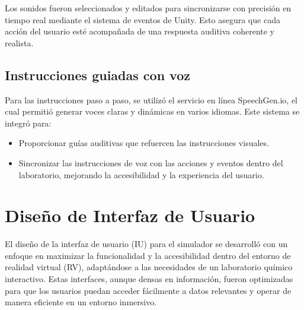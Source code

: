 Los sonidos fueron seleccionados y editados para sincronizarse con precisión en tiempo real mediante el sistema de eventos de Unity. Esto asegura que cada acción del usuario esté acompañada de una respuesta auditiva coherente y realista.
\subsection{Instrucciones guiadas con voz}
Para las instrucciones paso a paso, se utilizó el servicio en línea SpeechGen.io, el cual permitió generar voces claras y dinámicas en varios idiomas. Este sistema se integró para:
\begin{itemize}
    \item Proporcionar guías auditivas que refuercen las instrucciones visuales.
    \item Sincronizar las instrucciones de voz con las acciones y eventos dentro del laboratorio, mejorando la accesibilidad y la experiencia del usuario.
\end{itemize}

\section{Diseño de Interfaz de Usuario}
El diseño de la interfaz de usuario (IU) para el simulador se desarrolló con un enfoque en maximizar la funcionalidad y la accesibilidad dentro del entorno de realidad virtual (RV), adaptándose a las necesidades de un laboratorio químico interactivo. Estas interfaces, aunque densas en información, fueron optimizadas para que los usuarios puedan acceder fácilmente a datos relevantes y operar de manera eficiente en un entorno inmersivo.

